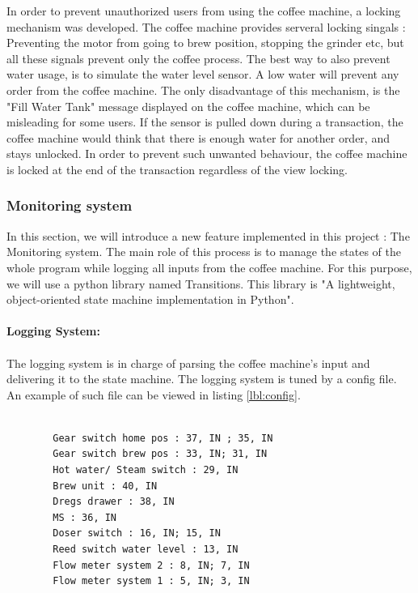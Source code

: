 \documentclass[12pt]{article}
\begin{document}
   In order to prevent unauthorized users from using the coffee machine, a locking mechanism was developed.
   The coffee machine provides serveral locking singals : Preventing the motor from going to brew position, stopping the grinder etc, but all these signals prevent only the coffee process.
   The best way to also prevent water usage, is to simulate the water level sensor. A low water will prevent any order from the coffee machine. 
   The only disadvantage of this mechanism, is the "Fill Water Tank" message displayed on the coffee machine, which can be misleading for some users.
   If the sensor is pulled down during a transaction, the coffee machine would think that there is enough water for another order, and stays unlocked.
   In order to prevent such unwanted behaviour, the coffee machine is locked at the end of the transaction regardless of the view locking.
   
  \subsubsection{Monitoring system}
  
  In this section, we will introduce a new feature implemented in this project : The Monitoring system. 
  The main role of this process is to manage the states of the whole program while logging all inputs from the coffee machine.
  For this purpose, we will use a python library named Transitions. This library is "A lightweight, object-oriented state machine implementation in Python"\cite{transitions}. \\~\\
  \textbf{Logging System:}\\~\\
  The logging system is in charge of parsing the coffee machine's input and delivering it to the state machine. The logging system is tuned by a config file.
  An example of such file can be viewed in listing \ref{lbl:config}.\\
 
  \begin{lstlisting}[caption={Example of config file for the logging system}, label={lbl:config}]
  
	    Gear switch home pos : 37, IN ; 35, IN
	    Gear switch brew pos : 33, IN; 31, IN
	    Hot water/ Steam switch : 29, IN
	    Brew unit : 40, IN
	    Dregs drawer : 38, IN
	    MS : 36, IN
	    Doser switch : 16, IN; 15, IN
	    Reed switch water level : 13, IN
	    Flow meter system 2 : 8, IN; 7, IN
	    Flow meter system 1 : 5, IN; 3, IN
	    
  \end{lstlisting}
\end{document}
